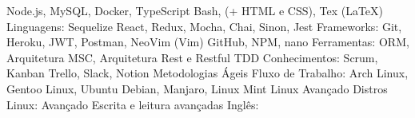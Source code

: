 \begin{cvhonors}
  \cvhonor
    {Node.js, MySQL, Docker, TypeScript}
    {Bash, (+ HTML e CSS), Tex (LaTeX)}
    {}
    {Linguagens:}
  \cvhonor
    {Sequelize}
    {React, Redux, Mocha, Chai, Sinon, Jest}
    {}
    {Frameworks:}
  \cvhonor
    {Git, Heroku, JWT, Postman, NeoVim (Vim)}
    {GitHub, NPM, nano}
    {}
    {Ferramentas:}
 \cvhonor
    {ORM, Arquitetura MSC, Arquitetura Rest e Restful}
    {TDD}
    {}
    {Conhecimentos:}
  \cvhonor
    {Scrum, Kanban}
    {Trello, Slack, Notion}
    {Metodologias Ágeis}
    {Fluxo de Trabalho:}
  \cvhonor
    {Arch Linux, Gentoo Linux, Ubuntu}
    {Debian, Manjaro, Linux Mint}
    {Linux Avançado}
    {Distros Linux:}
  \cvhonor
    {Avançado}
    {Escrita e leitura avançadas}
    {}
    {Inglês:}
\end{cvhonors}

\vspace{.5cm}
